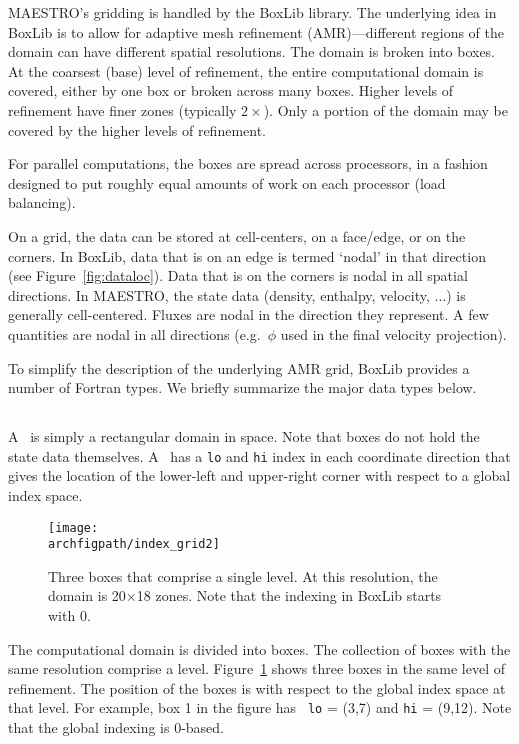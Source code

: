 MAESTRO's gridding is handled by the BoxLib library.  The underlying
idea in BoxLib is to allow for adaptive mesh refinement (AMR)---different
regions of the domain can have different spatial resolutions.  The
domain is broken into boxes.  At the coarsest (base) level of
refinement, the entire computational domain is covered, either by one
box or broken across many boxes.  Higher levels of refinement have
finer zones (typically $2\times$).  Only a portion of the domain may
be covered by the higher levels of refinement.  

For parallel computations, the boxes are spread across processors, in
a fashion designed to put roughly equal amounts of work on each
processor (load balancing).

On a grid, the data can be stored at cell-centers, on a face/edge, or
on the corners.  In BoxLib, data that is on an edge is termed `nodal'
in that direction (see Figure~\ref{fig:dataloc}).  Data that is on the
corners is nodal in all spatial directions.  In MAESTRO, the state
data (density, enthalpy, velocity, $\ldots$) is generally
cell-centered.  Fluxes are nodal in the direction they represent.
A few quantities are nodal in all directions (e.g.\ $\phi$ used in
the final velocity projection).

To simplify the description of the underlying AMR grid, BoxLib
provides a number of Fortran types.  We briefly summarize the major
data types below.


\subsection{\boxtype}

A \boxtype\ is simply a rectangular domain in space.  Note that boxes
do not hold the state data themselves.  A \boxtype\ has a {\tt lo} 
and {\tt hi} index in each coordinate direction that gives the
location of the lower-left and upper-right corner with respect to
a global index space.  

\begin{figure}[t]
\centering
\texttt{[image: \\archfigpath/index\_grid2]}
\caption[Single-level grid structure]
{\label{fig:boxes} Three boxes that comprise a single level.  At this
  resolution, the domain is 20$\times$18 zones.  Note that the
  indexing in BoxLib starts with $0$.}
\end{figure}


The computational domain is divided into boxes.  The collection of
boxes with the same resolution comprise a level.
Figure~\ref{fig:boxes} shows three boxes in the same level of
refinement.  The position of the boxes is with respect to the global
index space at that level.  For example, box 1 in the figure has {\tt
  lo} = (3,7) and {\tt hi} = (9,12).  Note that the global indexing
is 0-based.


